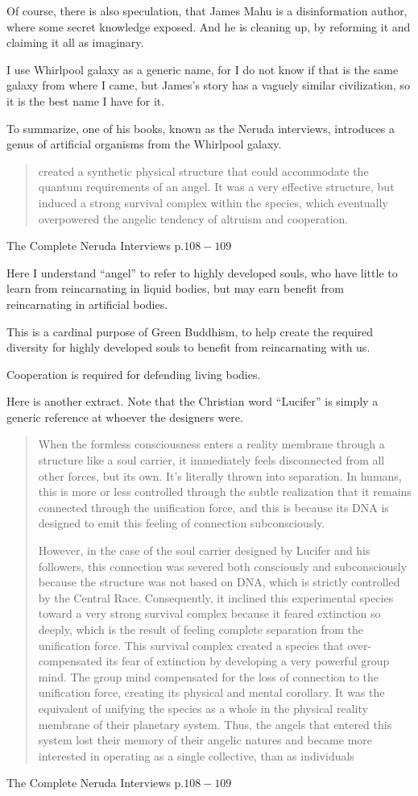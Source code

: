 \documentclass{report}
\begin{document}
Of course, there is also speculation, that James Mahu is a disinformation
author, where some secret knowledge exposed. And he is cleaning up, by reforming
it and claiming it all as imaginary. 

I use Whirlpool galaxy as a generic name, for I do not know if that is the same
galaxy from where I came, but James's story has a vaguely similar civilization,
so it is the best name I have for it.

To summarize, one of his books, known as the Neruda interviews, introduces a
genus of artificial organisms from the Whirlpool galaxy.

\blockquote{created  a  synthetic  physical  structure  that  could  accommodate
the  quantum requirements of an angel. It was a very effective structure, but
induced a strong survival complex  within  the  species,  which  eventually
overpowered  the  angelic  tendency  of altruism and cooperation.}{The Complete Neruda Interviews p.$108-109$\cite{neruda}}

Here I understand ``angel'' to refer to highly developed souls, who have little
to learn from reincarnating in liquid bodies, but may earn benefit from
reincarnating in artificial bodies.

This is a cardinal purpose of Green Buddhism, to help create the required
diversity for highly developed souls to benefit from reincarnating with us.

Cooperation is required for defending living bodies.

Here is another extract. Note that the Christian word ``Lucifer'' is simply a
generic reference at whoever the designers were.

\blockquote{When the formless consciousness enters a reality membrane through a
 structure like a soul carrier, it immediately feels disconnected from all other
forces, but its own. It’s literally thrown into separation. In humans, this is
more or less controlled through the subtle realization that it remains connected
through the unification force, and  this  is  because  its  DNA  is  designed
to  emit this  feeling  of  connection  subconsciously.

However, in the case of the soul carrier designed by Lucifer and his followers,
this connection was severed both consciously and subconsciously because the 
structure was not based on DNA, which is strictly controlled by the Central 
Race. Consequently, it inclined this experimental species toward a very
strong survival complex because it feared extinction so deeply, which is
the result of feeling complete separation from the unification force. This
survival complex created a species that over-compensated its fear of
extinction by developing a very powerful group mind. The group mind
compensated for the loss of connection to the unification force,
creating its physical and mental corollary. It was the equivalent of unifying
the species as a whole in the physical reality membrane of their planetary
system. Thus, the angels that entered this system lost their memory of
their angelic natures and became more interested in operating as a single
collective, than as individuals}{The Complete Neruda Interviews p.$108-109$\cite{neruda}}
\end{document}
